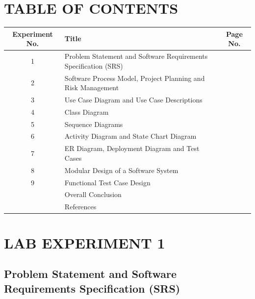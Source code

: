 \documentclass[12pt,a4paper]{article}
\renewcommand{\arraystretch}{1.18}
\begin{document}
\clearpage
\section*{TABLE OF CONTENTS}\label{table-of-contents}
\vspace{0.5cm}
\begin{center}
\renewcommand{\arraystretch}{1.55}
\begin{tabular}{|c|p{10.2cm}|c|}
\hline
\textbf{Experiment No.} & \centering\arraybackslash\textbf{Title} & \textbf{Page No.}\\
\hline
1 & Problem Statement and Software Requirements Specification (SRS) & \pageref{lab-experiment-1}\\
\hline
2 & Software Process Model, Project Planning and Risk Management & \pageref{lab-experiment-2}\\
\hline
3 & Use Case Diagram and Use Case Descriptions & \pageref{lab-experiment-3}\\
\hline
4 & Class Diagram & \pageref{lab-experiment-4}\\
\hline
5 & Sequence Diagrams & \pageref{lab-experiment-5}\\
\hline
6 & Activity Diagram and State Chart Diagram & \pageref{lab-experiment-6}\\
\hline
7 & ER Diagram, Deployment Diagram and Test Cases & \pageref{lab-experiment-7}\\
\hline
8 & Modular Design of a Software System & \pageref{lab-experiment-8}\\
\hline
9 & Functional Test Case Design & \pageref{lab-experiment-9}\\
\hline
 & Overall Conclusion & \pageref{overall-conclusion}\\
\hline
 & References & \pageref{references}\\
\hline
\end{tabular}
\end{center}
\clearpage

\section{LAB EXPERIMENT 1}\label{lab-experiment-1}

\subsection{Problem Statement and Software Requirements Specification
(SRS)}\label{problem-statement-and-software-requirements-specification-srs}
\end{document}
